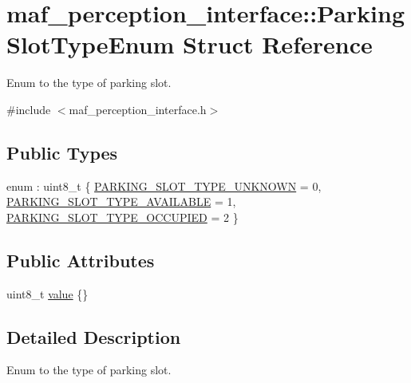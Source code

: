\hypertarget{structmaf__perception__interface_1_1ParkingSlotTypeEnum}{}\section{maf\+\_\+perception\+\_\+interface\+:\+:Parking\+Slot\+Type\+Enum Struct Reference}
\label{structmaf__perception__interface_1_1ParkingSlotTypeEnum}


Enum to the type of parking slot.  




{\ttfamily \#include $<$maf\+\_\+perception\+\_\+interface.\+h$>$}

\subsection*{Public Types}
\begin{DoxyCompactItemize}
\item 
enum \+: uint8\+\_\+t \{ \hyperlink{structmaf__perception__interface_1_1ParkingSlotTypeEnum_a9f41243b55b4cd7d1ecab2a2929b8277a1e21004d31f673ab1babb7a277f8642f}{P\+A\+R\+K\+I\+N\+G\+\_\+\+S\+L\+O\+T\+\_\+\+T\+Y\+P\+E\+\_\+\+U\+N\+K\+N\+O\+WN} = 0, 
\hyperlink{structmaf__perception__interface_1_1ParkingSlotTypeEnum_a9f41243b55b4cd7d1ecab2a2929b8277a18273eccc2838bd49437eb6985418dcc}{P\+A\+R\+K\+I\+N\+G\+\_\+\+S\+L\+O\+T\+\_\+\+T\+Y\+P\+E\+\_\+\+A\+V\+A\+I\+L\+A\+B\+LE} = 1, 
\hyperlink{structmaf__perception__interface_1_1ParkingSlotTypeEnum_a9f41243b55b4cd7d1ecab2a2929b8277a7bd5f385c4c834e6bf09a2233c1657e1}{P\+A\+R\+K\+I\+N\+G\+\_\+\+S\+L\+O\+T\+\_\+\+T\+Y\+P\+E\+\_\+\+O\+C\+C\+U\+P\+I\+ED} = 2
 \}
\end{DoxyCompactItemize}
\subsection*{Public Attributes}
\begin{DoxyCompactItemize}
\item 
uint8\+\_\+t \hyperlink{structmaf__perception__interface_1_1ParkingSlotTypeEnum_a5a892dd42d6c825ff03c45764a752a34}{value} \{\}
\end{DoxyCompactItemize}


\subsection{Detailed Description}
Enum to the type of parking slot. 

